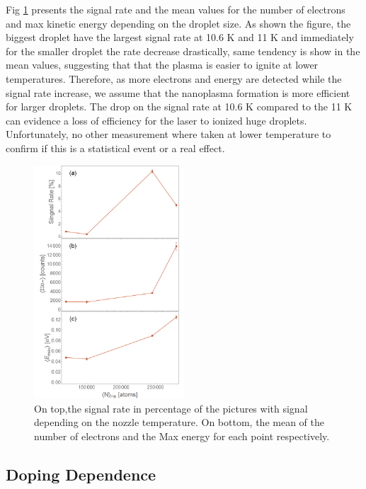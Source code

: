 Fig \ref{fig:Alldropletsize} presents the signal rate and the mean values for the number of electrons and max kinetic energy depending on the droplet size. As shown the figure, the biggest droplet have the largest signal rate at 10.6 K and 11 K and immediately for the smaller droplet the rate decrease drastically, same tendency is show in the mean values, suggesting that that the plasma is easier to ignite at lower temperatures. Therefore, as more electrons and energy are detected while the signal rate increase, we assume that the nanoplasma formation is more efficient for larger droplets. The drop on the signal rate at 10.6 K compared to the 11 K can evidence a loss of efficiency for the laser to ionized huge droplets. Unfortunately, no other measurement where taken at lower temperature to confirm if this is a statistical event or a real effect.

\begin{figure}[h!]
\centering
\includegraphics[width=0.5\textwidth]{../Images/results/Mir_He_Dropletsize/Alltogether.png} 
\caption[MIR He droplet size dependence]{On top,the signal rate in percentage of the pictures with signal depending on the nozzle temperature. On bottom, the mean of the number of electrons and the Max energy for each point respectively.}
\label{fig:Alldropletsize}
\end{figure}

\subsection{Doping Dependence}

